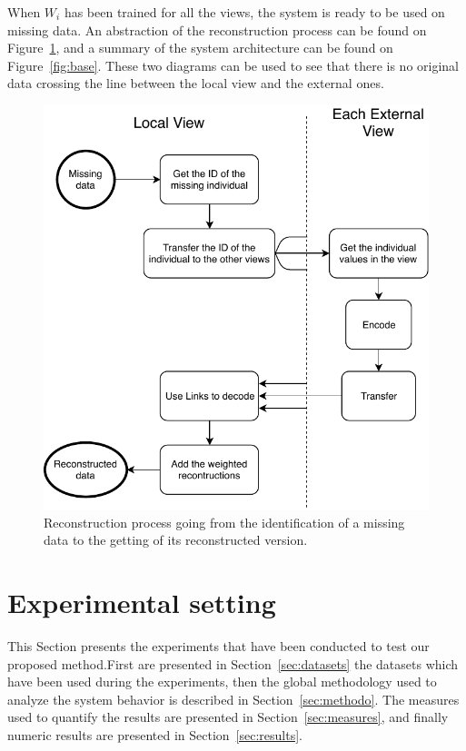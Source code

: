 When $W_i$ has been trained for all the views, the system is ready to be used on missing data. An abstraction of the reconstruction process can be found on Figure~\ref{fig:process}, and a summary of the system architecture can be found on Figure~\ref{fig:base}. These two diagrams can be used to see that there is no original data crossing the line between the local view and the external ones.
	
	\begin{figure}[h]
		\centering
		\includegraphics[scale=0.8]{img/process.pdf}
        \caption{Reconstruction process going from the identification of a
        missing data to the getting of its reconstructed version.}
\label{fig:process}
	\end{figure}	
	
	\section{Experimental setting}
\label{sec:exp}
This Section presents the experiments that have been conducted to test our proposed method.\@ First are presented in Section~\ref{sec:datasets} the datasets which have been used during the experiments, then the global methodology used to analyze the system behavior is described in Section~\ref{sec:methodo}. The measures used to quantify the results are presented in Section~\ref{sec:measures}, and finally numeric results are presented in Section~\ref{sec:results}.

